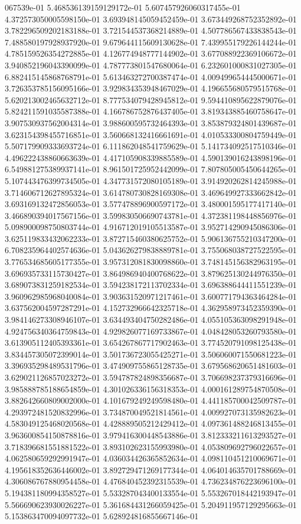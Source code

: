 067539e-01	5.468536139159129172e-01	5.607457926060317455e-01	4.372573050005598150e-01	3.693948145059452459e-01	3.673449268752352892e-01	3.782296509202183188e-01	3.721544537368214889e-01	4.507786567433838543e-01	7.488580197928937920e-01	9.679644115609130628e-01	7.439955179226144244e-01	4.785159526354272885e-01	4.126774948777144902e-01	3.677088922369106672e-01	3.940852196043390099e-01	4.787773801547680064e-01	6.232601000831027305e-01	6.882415145868768791e-01	5.613463272700387474e-01	4.009499654445000671e-01	3.726353785156095166e-01	3.929834353948467029e-01	4.196655680579515768e-01	5.620213002465632712e-01	8.777534079428945812e-01	9.594410895622879076e-01	5.824211591035587388e-01	4.166786752876437405e-01	3.819343885460758647e-01	3.907530937562004314e-01	3.988600595732464393e-01	3.853879324801439687e-01	3.623154398455716851e-01	3.560668132416661691e-01	4.010533300804759449e-01	5.507179909333693724e-01	6.111862048541759629e-01	5.141734092517510346e-01	4.496222438860663639e-01	4.417105908339885589e-01	4.590139016243898196e-01	6.549881275389937141e-01	8.961501725952442099e-01	7.807805005450644265e-01	5.107443476399734505e-01	4.347731572080105189e-01	3.914920262814245988e-01	3.714606712627895324e-01	3.614780730828169308e-01	3.469649927333662842e-01	3.693169132472856053e-01	3.577478896900597172e-01	3.480001595177417140e-01	3.466890394017567156e-01	3.599830506690743781e-01	4.372381198448856976e-01	5.098900098750803744e-01	4.916712019105513587e-01	3.952714290945086306e-01	3.625119833432062233e-01	3.872715460380625752e-01	5.906136755210347200e-01	6.708235964402574636e-01	5.043626279838889781e-01	3.755068038727522595e-01	3.776534685605177355e-01	3.957312081830098860e-01	3.748145156382963195e-01	3.696935733115730427e-01	3.864986940400768622e-01	3.879625130244976350e-01	3.689073831259182534e-01	3.594238172113702334e-01	3.696388644411551239e-01	3.960962985968040084e-01	3.903631520971217461e-01	3.600771794363464284e-01	3.637562004597287291e-01	4.152732966642325718e-01	4.362958973452359390e-01	3.984146273308946107e-01	3.634493404750282486e-01	4.055105363098291948e-01	4.924756340364759843e-01	4.929826077169733867e-01	4.048428053260793580e-01	3.613905112405393361e-01	3.654267867717902463e-01	3.774520791098125438e-01	3.834457305072399014e-01	3.501736723055425271e-01	3.506060071550681223e-01	3.396935298489531796e-01	3.474909755865128735e-01	3.679568620651481603e-01	3.629021126857023272e-01	3.594787824898356687e-01	3.706698237379316696e-01	3.985888785188654859e-01	4.301026336156318353e-01	4.000161289754870508e-01	3.882642660809002000e-01	4.101679249249598480e-01	4.441185700042509787e-01	4.293972481520832996e-01	3.734870049521814561e-01	4.009927073135982623e-01	4.583049125468020568e-01	4.428889505212429412e-01	4.097361488246813455e-01	3.963600854150878816e-01	3.979416300448543886e-01	3.812333211613293527e-01	3.718396681551881522e-01	3.893102623155993980e-01	4.053809692796022657e-01	4.062580659292991947e-01	4.036034426365852634e-01	4.098110451210069671e-01	4.195618352636446002e-01	3.892729471269177344e-01	4.064014635701788669e-01	4.306086767880954458e-01	4.476840452392315539e-01	4.736234876223696100e-01	5.194381180994358527e-01	5.533287043400133554e-01	5.553267018442193947e-01	5.566690623930026227e-01	5.361684431266059425e-01	5.204911957129295663e-01	5.153863470094097732e-01	5.628924816855667146e-01	